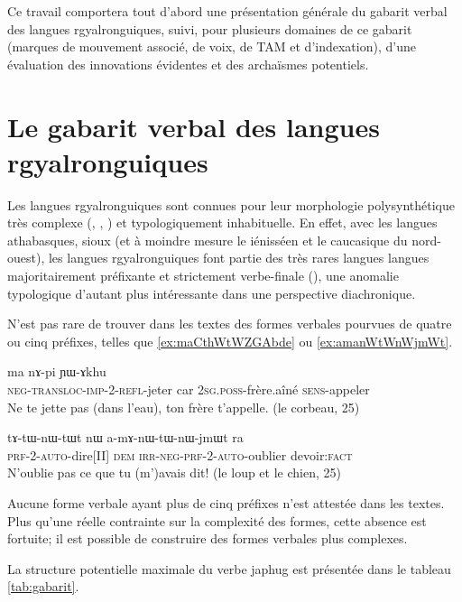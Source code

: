 \documentclass[oldfontcommands,oneside,a4paper,11pt]{article}
\newcommand{\ipa}[1]{{\phon \mbox{#1}}} %
\begin{document}
Ce travail comportera tout d'abord une présentation générale du gabarit verbal des langues rgyalronguiques, suivi, pour plusieurs domaines de ce gabarit (marques de mouvement associé, de voix, de TAM et d'indexation), d'une évaluation des innovations évidentes et des archaïsmes potentiels.

\section{Le gabarit verbal des langues rgyalronguiques}
Les langues rgyalronguiques sont connues pour leur morphologie polysynthétique très complexe (\citealt{jacques12incorp}, \citealt{lai13affixale}, \citealt{jackson14morpho}) et typologiquement inhabituelle. En effet, avec les langues athabasques, sioux (et à moindre mesure le iénisséen  et le caucasique du nord-ouest), les langues rgyalronguiques font partie des très rares langues langues majoritairement préfixante et strictement verbe-finale (\citealt{jacques13harmonization}), une anomalie typologique d'autant plus intéressante dans une perspective diachronique.
 
N'est pas rare de trouver dans les textes des formes verbales pourvues de quatre ou cinq préfixes, telles que \ref{ex:maCthWtWZGAbde} ou \ref{ex:amanWtWnWjmWt}. 


\begin{exe}
\ex \label{ex:maCthWtWZGAbde}
\gll \ipa{ma-ɕ-thɯ-tɯ-ʑɣɤ-βde}  	\ipa{ma}  	\ipa{nɤ-pi}  	\ipa{ɲɯ-ɤkhu}  \\
\textsc{neg-transloc-imp-2-refl}-jeter car \textsc{2sg.poss}-frère.aîné \textsc{sens}-appeler \\
\glt Ne te jette pas (dans l'eau), ton frère t'appelle. (le corbeau, 25)
\end{exe}
\begin{exe}
\ex  \label{ex:amanWtWnWjmWt}
\gll
\ipa{tɤ-tɯ-nɯ-tɯt}  	\ipa{nɯ}  	\ipa{a-mɤ-nɯ-tɯ-nɯ-jmɯt}  	\ipa{ra}  \\
\textsc{prf-2-auto}-dire[II] \textsc{dem} \textsc{irr-neg-prf-2-auto}-oublier devoir:\textsc{fact} \\
\glt N'oublie pas ce que tu (m')avais dit! (le loup et le chien, 25)
\end{exe}

Aucune forme verbale ayant plus de cinq préfixes n'est attestée dans les textes. Plus qu'une réelle contrainte sur la complexité des formes, cette absence est fortuite; il est possible de construire des formes verbales plus complexes. 

La structure potentielle maximale du verbe japhug est présentée dans le tableau \ref{tab:gabarit}.
\end{document}
